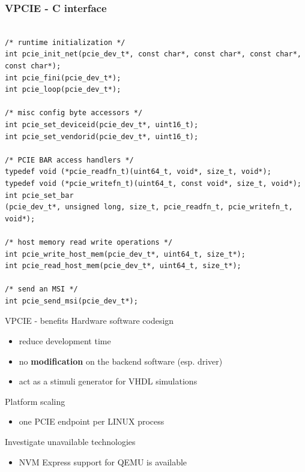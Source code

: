 \documentclass{beamer}
\begin{document}
\begin{frame}[containsverbatim]
 \frametitle{VPCIE - C interface}
 \begin{tiny}
 \lstset{language=C}
 \begin{lstlisting}[frame=tb]

/* runtime initialization */
int pcie_init_net(pcie_dev_t*, const char*, const char*, const char*, const char*);
int pcie_fini(pcie_dev_t*);
int pcie_loop(pcie_dev_t*);

/* misc config byte accessors */
int pcie_set_deviceid(pcie_dev_t*, uint16_t);
int pcie_set_vendorid(pcie_dev_t*, uint16_t);

/* PCIE BAR access handlers */
typedef void (*pcie_readfn_t)(uint64_t, void*, size_t, void*);
typedef void (*pcie_writefn_t)(uint64_t, const void*, size_t, void*);
int pcie_set_bar
(pcie_dev_t*, unsigned long, size_t, pcie_readfn_t, pcie_writefn_t, void*);

/* host memory read write operations */
int pcie_write_host_mem(pcie_dev_t*, uint64_t, size_t*);
int pcie_read_host_mem(pcie_dev_t*, uint64_t, size_t*);

/* send an MSI */
int pcie_send_msi(pcie_dev_t*);
 \end{lstlisting}
 \end{tiny}
\end{frame}

\begin{frame}{VPCIE - benefits}
  Hardware software codesign
  \begin{itemize}
  \item reduce development time
  \item no \textbf{modification} on the backend software (esp. driver)
  \item act as a stimuli generator for VHDL simulations
  \end{itemize}

  Platform scaling
  \begin{itemize}
  \item one PCIE endpoint per LINUX process
  \end{itemize}

  Investigate unavailable technologies
  \begin{itemize}
  \item NVM Express support for QEMU is available
  \end{itemize}
\end{frame}
\end{document}
